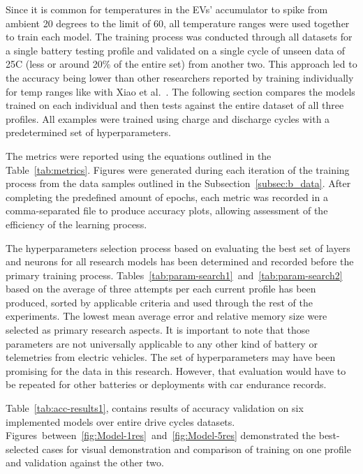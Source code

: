 %
Since it is common for temperatures in the EVs' accumulator to spike from ambient 20 degrees to the limit of 60, all temperature ranges were used together to train each model.
The training process was conducted through all datasets for a single battery testing profile and validated on a single cycle of unseen data of 25\textdegree{}C (less or around 20\% of the entire set) from another two.
This approach led to the accuracy being lower than other researchers reported by training individually for temp ranges like with Xiao et al.~\cite{xiao_accurate_2019}.
The following section compares the models trained on each individual and then tests against the entire dataset of all three profiles.
All examples were trained using charge and discharge cycles with a predetermined set of hyperparameters. %

%
The metrics were reported using the equations outlined in the \mbox{Table~\ref{tab:metrics}}.
Figures were generated during each iteration of the training process from the data samples outlined in the \mbox{Subsection~\ref{subsec:b_data}}.
After completing the predefined amount of epochs, each metric was recorded in a comma-separated file to produce accuracy plots, allowing assessment of the efficiency of the learning process.

%
The hyperparameters selection process based on evaluating the best set of layers and neurons for all research models has been determined and recorded before the primary training process.
\mbox{Tables~\ref{tab:param-search1} and~\ref{tab:param-search2}} based on the average of three attempts per each current profile has been produced, sorted by applicable criteria and used through the rest of the experiments.
The lowest mean average error and relative memory size were selected as primary research aspects.
It is important to note that those parameters are not universally applicable to any other kind of battery or telemetries from electric vehicles.
The set of hyperparameters may have been promising for the data in this research.
However, that evaluation would have to be repeated for other batteries or deployments with car endurance records.

%
%
\mbox{Table~\ref{tab:acc-results1}}, contains results of accuracy validation on six implemented models over entire drive cycles datasets.
\mbox{Figures between \ref{fig:Model-1res} and \ref{fig:Model-5res}} demonstrated the best-selected cases for visual demonstration and comparison of training on one profile and validation against the other two.

